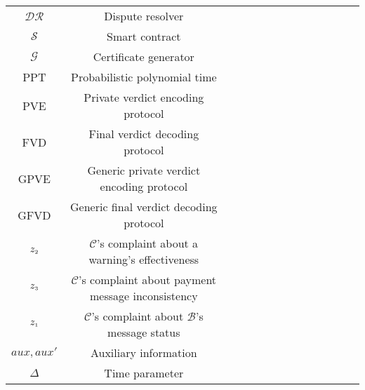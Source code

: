 \begin{table}[!htbp]
\begin{scriptsize}
\begin{center}
{{\begin{tabular}{|c|c|c|c|c|c|c|c|c|c|c|c|c|c|}
%
\cellcolor{white!20}\scriptsize$\mathcal{DR}$ &\cellcolor{white!20}\scriptsize Dispute resolver  \\  
%
\cellcolor{gray!20}\scriptsize$\mathcal{S}$ &\cellcolor{gray!20}\scriptsize Smart contract  \\  
%
\cellcolor{white!20}\scriptsize$\mathcal{G}$ &\cellcolor{white!20}\scriptsize Certificate generator  \\  
%
%
\cellcolor{gray!20}\scriptsize PPT&\cellcolor{gray!20}\scriptsize  Probabilistic polynomial time \\    
%
\cellcolor{white!20}\scriptsize{PVE} &\cellcolor{white!20}\scriptsize  Private verdict encoding protocol\\ 
%
\cellcolor{gray!20}\scriptsize{FVD} &\cellcolor{gray!20}\scriptsize  Final verdict decoding protocol\\ 
%
\cellcolor{white!20}\scriptsize{GPVE} &\cellcolor{white!20}\scriptsize  Generic private verdict encoding protocol\\ 
%
\cellcolor{gray!20}\scriptsize{GFVD} &\cellcolor{gray!20}\scriptsize  Generic final verdict decoding protocol\\ 
%

%
\cellcolor{white!20}\scriptsize$z_{\scriptscriptstyle 2}$ &\cellcolor{white!20}\scriptsize  $\mathcal{C}$'s complaint about a warning's effectiveness\\
%

%
%
%


% 
\cellcolor{gray!20}\scriptsize$z_{\scriptscriptstyle 3}$ &\cellcolor{gray!20}\scriptsize  $\mathcal{C}$'s complaint about payment message  inconsistency\\ 
%
\cellcolor{white!20}\scriptsize$z_{\scriptscriptstyle 1}$ &\cellcolor{white!20}\scriptsize  $\mathcal{C}$'s complaint about $\mathcal{B}$'s message status\\ 

\cellcolor{gray!20}\scriptsize$aux, aux'$ &\cellcolor{gray!20}\scriptsize  Auxiliary information\\ 
%
%
\cellcolor{white!20}\scriptsize$\Delta$ &\cellcolor{white!20}\scriptsize  Time parameter \\ 


\end{tabular}}}
\end{center}
\end{scriptsize}
\end{table}
